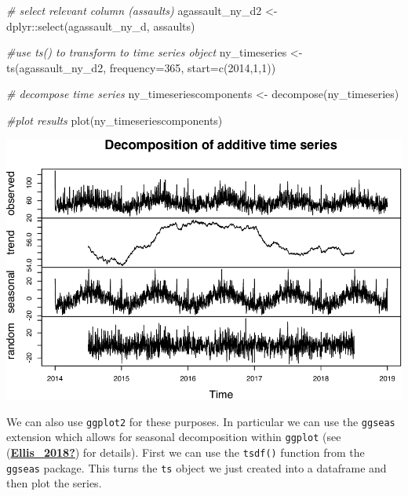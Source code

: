 \documentclass[
  krantz2]{krantz}
\makeatletter
\newenvironment{Shaded}{\begin{snugshade}}{\end{snugshade}}
\newcommand{\AttributeTok}[1]{\textcolor[rgb]{0.61,0.61,0.61}{#1}}
\newcommand{\CommentTok}[1]{\textcolor[rgb]{0.37,0.37,0.37}{\textit{#1}}}
\newcommand{\DecValTok}[1]{\textcolor[rgb]{0.06,0.06,0.06}{#1}}
\newcommand{\FunctionTok}[1]{\textcolor[rgb]{0,0,0}{#1}}
\newcommand{\NormalTok}[1]{#1}
\newcommand{\OtherTok}[1]{\textcolor[rgb]{0.37,0.37,0.37}{#1}}
\newcommand{\SpecialCharTok}[1]{\textcolor[rgb]{0,0,0}{#1}}
\newenvironment{kframe}{%
\medskip{}
\setlength{\fboxsep}{.8em}
 \def\at@end@of@kframe{}%
 \ifinner\ifhmode%
  \def\at@end@of@kframe{\end{minipage}}%
  \begin{minipage}{\columnwidth}%
 \fi\fi%
 \def\FrameCommand##1{\hskip\@totalleftmargin \hskip-\fboxsep
 \colorbox{shadecolor}{##1}\hskip-\fboxsep
     \hskip-\linewidth \hskip-\@totalleftmargin \hskip\columnwidth}%
 \MakeFramed {\advance\hsize-\width
   \@totalleftmargin\z@ \linewidth\hsize
   \@setminipage}}%
 {\par\unskip\endMakeFramed%
 \at@end@of@kframe}
\renewenvironment{Shaded}{\begin{kframe}}{\end{kframe}}
\makeatother
\begin{document}
\begin{Shaded}
\begin{Highlighting}[]
\CommentTok{\# select relevant column (assaults)}
\NormalTok{agassault\_ny\_d2 }\OtherTok{\textless{}{-}}\NormalTok{ dplyr}\SpecialCharTok{::}\FunctionTok{select}\NormalTok{(agassault\_ny\_d, assaults)}

\CommentTok{\#use ts() to transform to time series object}
\NormalTok{ny\_timeseries }\OtherTok{\textless{}{-}} \FunctionTok{ts}\NormalTok{(agassault\_ny\_d2, }
                    \AttributeTok{frequency=}\DecValTok{365}\NormalTok{, }
                    \AttributeTok{start=}\FunctionTok{c}\NormalTok{(}\DecValTok{2014}\NormalTok{,}\DecValTok{1}\NormalTok{,}\DecValTok{1}\NormalTok{))}

\CommentTok{\# decompose time series}
\NormalTok{ny\_timeseriescomponents }\OtherTok{\textless{}{-}} \FunctionTok{decompose}\NormalTok{(ny\_timeseries)}

\CommentTok{\#plot results}
\FunctionTok{plot}\NormalTok{(ny\_timeseriescomponents)}
\end{Highlighting}
\end{Shaded}

\includegraphics{crime_mapping_files/figure-latex/decompose_8b-1.pdf}

We can also use \texttt{ggplot2} for these purposes. In particular we can use the \texttt{ggseas} extension which allows for seasonal decomposition within \texttt{ggplot} (see (\protect\hyperlink{ref-Ellis_2018}{\textbf{Ellis\_2018?}}) for details). First we can use the \texttt{tsdf()} function from the \texttt{ggseas} package. This turns the \texttt{ts} object we just created into a dataframe and then plot the series.
\end{document}
